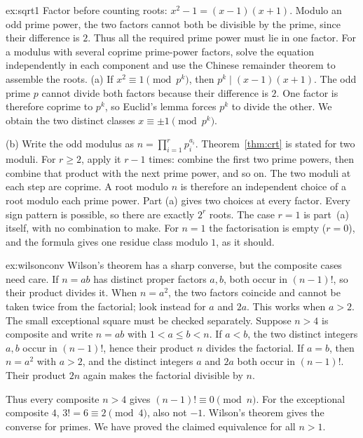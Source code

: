 \begin{solution}{ex:sqrt1}
\idea Factor before counting roots: $x^2-1=(x-1)(x+1)$. Modulo an odd prime power, the two factors cannot both be divisible by the prime, since their difference is $2$. Thus all the required prime power must lie in one factor. For a modulus with several coprime prime-power factors, solve the equation independently in each component and use the Chinese remainder theorem to assemble the roots.
\writeup (a) If $x^2\equiv1\pmod{p^k}$, then $p^k\mid(x-1)(x+1)$. The odd prime $p$ cannot divide both factors because their difference is $2$. One factor is therefore coprime to $p^k$, so Euclid's lemma forces $p^k$ to divide the other. We obtain the two distinct classes $x\equiv\pm1\pmod{p^k}$.

(b) Write the odd modulus as $n=\prod_{i=1}^r p_i^{a_i}$. Theorem~\ref{thm:crt} is stated for two moduli. For $r\ge2$, apply it $r-1$ times: combine the first two prime powers, then combine that product with the next prime power, and so on. The two moduli at each step are coprime. A root modulo $n$ is therefore an independent choice of a root modulo each prime power. Part (a) gives two choices at every factor. Every sign pattern is possible, so there are exactly $2^r$ roots. The case $r=1$ is part~(a) itself, with no combination to make. For $n=1$ the factorisation is empty ($r=0$), and the formula gives one residue class modulo $1$, as it should.
\end{solution}

\begin{solution}{ex:wilsonconv}
\idea Wilson's theorem has a sharp converse, but the composite cases need care. If $n=ab$ has distinct proper factors $a,b$, both occur in $(n-1)!$, so their product divides it. When $n=a^2$, the two factors coincide and cannot be taken twice from the factorial; look instead for $a$ and $2a$. This works when $a>2$. The small exceptional square must be checked separately.
\writeup Suppose $n>4$ is composite and write $n=ab$ with $1<a\le b<n$. If $a<b$, the two distinct integers $a,b$ occur in $(n-1)!$, hence their product $n$ divides the factorial. If $a=b$, then $n=a^2$ with $a>2$, and the distinct integers $a$ and $2a$ both occur in $(n-1)!$. Their product $2n$ again makes the factorial divisible by $n$.

Thus every composite $n>4$ gives $(n-1)!\equiv0\pmod n$. For the exceptional composite $4$, $3!=6\equiv2\pmod4$, also not $-1$. Wilson's theorem gives the converse for primes. We have proved the claimed equivalence for all $n>1$.
\end{solution}

